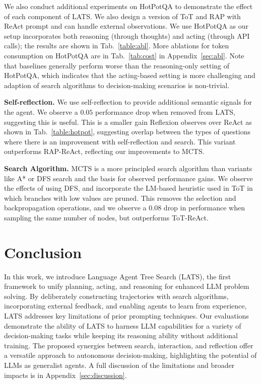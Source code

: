 \documentclass{article} \usepackage{iclr2024_conference,times}
\begin{document}
We also conduct additional experiments on HotPotQA to demonstrate the effect of each component of LATS. We also design a version of ToT and RAP with ReAct prompt and can handle external observations. We use HotPotQA as our setup incorporates both reasoning (through thoughts) and acting (through API calls); the results are shown in Tab.~\ref{table:abl}. More ablations for token consumption on HotPotQA are in Tab.~\ref{tab:cost} in Appendix~\ref{sec:abl}. Note that baselines generally perform worse than the reasoning-only setting of HotPotQA, which indicates that the acting-based setting is more challenging and adaption of search algorithms to decision-making scenarios is non-trivial.

\textbf{Self-reflection.} We use self-reflection to provide additional semantic signals for the agent. We observe a $0.05$ performance drop when removed from LATS, suggesting this is useful. This is a smaller gain Reflexion \citep{shinn2023reflexion} observes over ReAct \citep{yao2023react} as shown in Tab.~\ref{table:hotpot}, suggesting overlap between the types of questions where there is an improvement with self-reflection and search. This variant outperforms RAP-ReAct, reflecting our improvements to MCTS.

\textbf{Search Algorithm.} MCTS is a more principled search algorithm than variants like A* or DFS search and the basis for observed performance gains. We observe the effects of using DFS, and incorporate the LM-based heuristic used in ToT \citep{yao2023tree} in which branches with low values are pruned. This removes the selection and backpropagation operations, and we observe a $0.08$ drop in performance when sampling the same number of nodes, but outperforms ToT-ReAct.

\section{Conclusion}

In this work, we introduce Language Agent Tree Search (LATS), the first framework to unify planning, acting, and reasoning for enhanced LLM problem solving. By deliberately constructing trajectories with search algorithms, incorporating external feedback, and enabling agents to learn from experience, LATS addresses key limitations of prior prompting techniques. Our evaluations demonstrate the ability of LATS to harness LLM capabilities for a variety of decision-making tasks while keeping its reasoning ability without additional training. The proposed synergies between search, interaction, and reflection offer a versatile approach to autonomous decision-making, highlighting the potential of LLMs as generalist agents. A full discussion of the limitations and broader impacts is in  Appendix~\ref{sec:discussion}.
\end{document}
